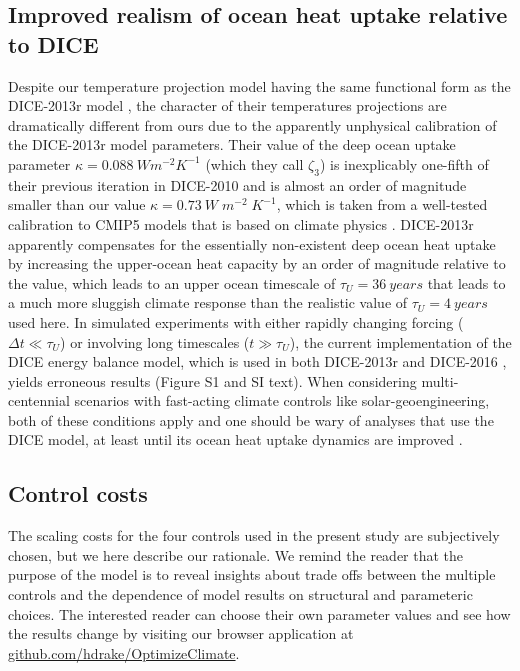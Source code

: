 \documentclass[9pt,twocolumn,twoside,lineno]{pnas-new}
\begin{document}
{\subsection*{Improved realism of ocean heat uptake relative to DICE}
Despite our temperature projection model having the same functional form as the DICE-2013r model \cite{nordhaus2013dice}, the character of their temperatures projections are dramatically different from ours due to the apparently unphysical calibration of the DICE-2013r model parameters. Their value of the deep ocean uptake parameter $\kappa = \SI{0.088}{W m^{-2} K^{-1}}$ (which they call $\zeta_{3}$) is inexplicably one-fifth of their previous iteration in DICE-2010 \cite{calel_physics_2016} and is almost an order of magnitude smaller than our value $\kappa = \SI{0.73}{W\; m^{-2}\; K^{-1}}$, which is taken from a well-tested calibration to CMIP5 models that is based on climate physics \cite{geoffroy_transient_2012}. DICE-2013r apparently compensates for the essentially non-existent deep ocean heat uptake by increasing the upper-ocean heat capacity by an order of magnitude relative to the \cite{geoffroy_transient_2012} value, which leads to an upper ocean timescale of $\tau_{U} = \SI{36}{years}$ that leads to a much more sluggish climate response than the realistic value of $\tau_{U} = \SI{4}{years}$ used here. In simulated experiments with either rapidly changing forcing ($\Delta t \ll \tau_{U}$) or involving long timescales ($t \gg \tau_{U}$), the current implementation of the DICE energy balance model, which is used in both DICE-2013r \cite{nordhaus2013dice} and DICE-2016 \cite{nordhaus_revisiting_2017}, yields erroneous results (Figure S1 and SI text). When considering multi-centennial scenarios with fast-acting climate controls like solar-geoengineering, both of these conditions apply and one should be wary of analyses that use the DICE model, at least until its ocean heat uptake dynamics are improved \cite{calel_physics_2016}.

\subsection*{Control costs}
The scaling costs for the four controls used in the present study are subjectively chosen, but we here describe our rationale. We remind the reader that the purpose of the model is to reveal insights about trade offs between the multiple controls and the dependence of model results on structural and parameteric choices. The interested reader can choose their own parameter values and see how the results change by visiting our browser application at \url{github.com/hdrake/OptimizeClimate}.

}
\end{document}
